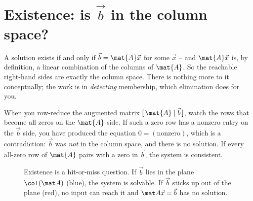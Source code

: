 \section{Existence: is \texorpdfstring{$\vec b$}{b} in the column space?}

A solution exists if and only if $\vec{b}=\mat{A}\vec{x}$ for some $\vec{x}$ -- and
$\mat{A}\vec{x}$ is, by definition, a linear combination of the columns of $\mat{A}$. So
the reachable right-hand sides are exactly the column space. There is nothing more to it
conceptually; the work is in \emph{detecting} membership, which elimination does for you.

When you row-reduce the augmented matrix $[\,\mat{A}\mid\vec{b}\,]$, watch the rows that
become all zeros on the $\mat{A}$ side. If such a zero row has a nonzero entry on the
$\vec{b}$ side, you have produced the equation $0=(\text{nonzero})$, which is a
contradiction: $\vec{b}$ was \emph{not} in the column space, and there is no solution. If
every all-zero row of $\mat{A}$ pairs with a zero in $\vec{b}$, the system is consistent.

\begin{figure}[H]
\centering
{}
\caption{Existence is a hit-or-miss question. If $\vec b$ lies in the plane
$\col(\mat A)$ (blue), the system is solvable. If $\vec b$ sticks up out of the plane
(red), no input can reach it and $\mat A\vec x=\vec b$ has no solution.}
\label{ch13:existence}
\end{figure}

